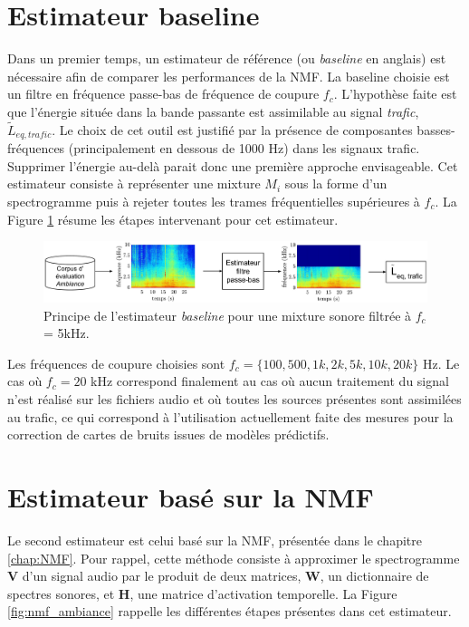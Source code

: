 \section{Estimateur baseline}
Dans un premier temps, un estimateur de référence (ou \textit{baseline} en anglais) est nécessaire afin de comparer les performances de la NMF. La baseline choisie est un filtre en fréquence passe-bas de fréquence de coupure $f_c$. L'hypothèse faite est que l'énergie située dans la bande passante est assimilable au signal \textit{trafic}, $\tilde{L}_{eq,trafic}$. Le choix de cet outil est justifié par la présence de composantes basses-fréquences (principalement en dessous de 1000 Hz) dans les signaux trafic. Supprimer l'énergie au-delà parait donc une première approche envisageable. %
Cet estimateur consiste à représenter une mixture $M_i$ sous la forme d'un spectrogramme puis à rejeter toutes les trames fréquentielles supérieures à $f_c$. La Figure \ref{fig:baseline} résume les étapes intervenant pour cet estimateur.

\begin{figure}[hbtp]
\centering
\includegraphics[width=\linewidth]{./figures/NMF/filtre_principe.pdf}
\caption{Principe de l'estimateur \textit{baseline}  pour une mixture sonore filtrée à $f_c$ = 5kHz.}
\label{fig:baseline}
\end{figure}

Les fréquences de coupure choisies sont $f_c = \lbrace 100, 500, 1k, 2k, 5k, 10k, 20k \rbrace$ Hz. Le cas où $f_c = 20$ kHz correspond finalement au cas où aucun traitement du signal n'est réalisé sur les fichiers audio et où toutes les sources présentes sont assimilées au trafic, ce qui correspond à l'utilisation actuellement faite des mesures pour la correction de cartes de bruits issues de modèles prédictifs.


\section{Estimateur basé sur la NMF}
Le second estimateur est celui basé sur la NMF, présentée dans le chapitre \ref{chap:NMF}. Pour rappel, cette méthode consiste à approximer le spectrogramme $\mathbf{V}$ d'un signal audio par le produit de deux matrices, $\mathbf{W}$, un dictionnaire de spectres sonores, et $\mathbf{H}$, une matrice d'activation temporelle. La Figure \ref{fig:nmf_ambiance} rappelle les différentes étapes présentes dans cet estimateur.

